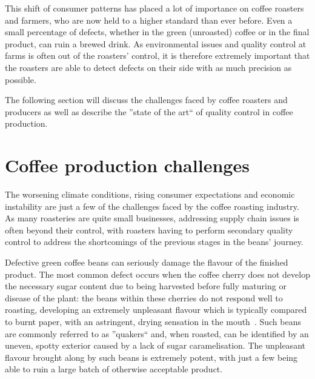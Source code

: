 This shift of consumer patterns has placed a lot of importance on coffee
roasters and farmers, who are now held to a higher standard than ever before.
Even a small percentage of defects, whether in the green (unroasted) coffee or in
the final product, can ruin a brewed drink.
As environmental issues and quality control
at farms is often out of the roasters' control, it is therefore extremely important
that the roasters are able to detect defects on their side with as much precision
as possible.

The following section will discuss the challenges faced by coffee roasters and producers
as well as describe the ''state of the art`` of quality control in coffee production.

\section{Coffee production challenges}
\label{sec:coffee-production-challenges}
The worsening climate conditions,
rising consumer expectations and economic instability are just a few of the
challenges faced by the coffee roasting industry.
As many roasteries are quite small
businesses, addressing supply chain issues is often beyond their control, with roasters
having to perform secondary quality control to address the shortcomings of the previous
stages in the beans' journey.

Defective green coffee beans can seriously damage the flavour of the finished
product.
The most common defect occurs when the coffee cherry does not develop the
necessary sugar content due to being harvested before fully maturing or disease of
the plant: the beans within these cherries do not respond well to roasting, developing
an extremely unpleasant flavour which is typically compared to burnt paper, with
an astringent, drying sensation in the mouth~\cite{colourSorterImg}.
Such beans are commonly referred
to as ''quakers`` and, when roasted, can be identified by an uneven, spotty exterior caused by a lack of sugar caramelisation.
The unpleasant flavour brought along by such beans is extremely potent, with just
a few being able to ruin a large batch of otherwise acceptable product.

